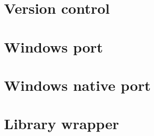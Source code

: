 \documentclass[a4paper,11pt]{article}
\begin{document}
\section{Version control}

\cleardoublepage

\section{Windows port}

\cleardoublepage

\section{Windows native port}

\cleardoublepage

\section{Library wrapper}


\ifpdf
\cleardoublepage
{}
{}
\fi
\printindex
\end{document}
